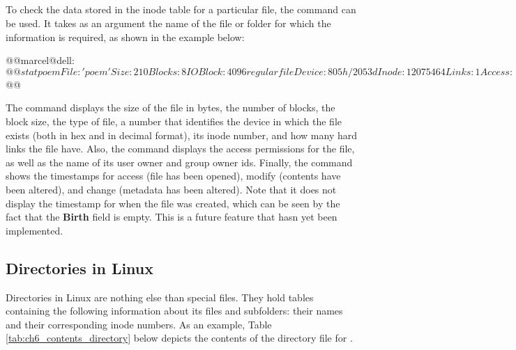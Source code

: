 \subsection{}
To check the data stored in the inode table for a particular file, the   command can be used. It takes as an argument the name of the file or folder for which the information is required, as shown in the example below:
\begin{command_line}[Bash]
@@marcel@dell:~$@@ stat poem
  File:  'poem'
  Size: 210       	Blocks: 8          IO Block: 4096   regular file
Device: 805h/2053d	Inode: 12075464    Links: 1
Access:(0664/-rw-rw-r--)  Uid:(1000/marcel)  Gid:(1000/marcel)
Access: 2016-08-01 17:54:19.553690653 -0400
Modify: 2016-07-27 21:49:03.334173611 -0400
Change: 2016-07-27 21:49:03.334173611 -0400
 Birth: -
@@marcel@dell:~$@@
\end{command_line}
The  command displays the size of the file in bytes, the number of blocks, the block size, the type of file, a number that identifies the device in which the file exists (both in hex and in decimal format), its inode number, and how many hard links the file have. Also, the  command displays the access permissions for the file, as well as the name of its user owner and group owner ids. Finally, the  command shows the timestamps for access (file has been opened), modify (contents have been altered), and change (metadata has been altered). Note that it does not display the timestamp for when the file was created, which can be seen by the fact that the \textbf{Birth} field is empty. This is a future feature that hasn yet been implemented.

\subsection{Directories in Linux}
\label{sec:ch6_directories}

Directories in Linux are nothing else than special files. They  hold tables containing the following information about its files and subfolders: their names and their corresponding inode numbers. As an example, Table \ref{tab:ch6_contents_directory} below depicts the contents of the directory file for .

